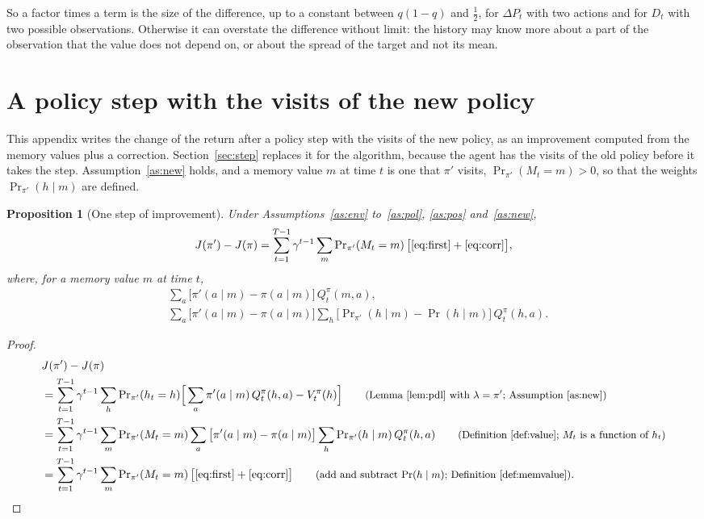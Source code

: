 \documentclass{article}
\newcounter{algo}
\newtheorem{proposition}{Proposition}[section]
\theoremstyle{definition}
\newcommand{\Prn}{\Pr\nolimits_{\pi'}}
\newcommand{\dP}{\Delta P}
\newcommand{\why}[1]{\tag*{\small(#1)}}
\begin{document}
So a factor times a term is the size of the difference, up to a constant between $q(1-q)$ and $\tfrac12$, for $\dP_t$ with two actions and for $D_t$ with two possible observations. Otherwise it can overstate the difference without limit: the history may know more about a part of the observation that the value does not depend on, or about the spread of the target and not its mean.

\section{A policy step with the visits of the new policy}\label{sec:layer5}

This appendix writes the change of the return after a policy step with the visits of the new policy, as an improvement computed from the memory values plus a correction. Section~\ref{sec:step} replaces it for the algorithm, because the agent has the visits of the old policy before it takes the step. Assumption~\ref{as:new} holds, and a memory value $m$ at time $t$ is one that $\pi'$ visits, $\Prn(M_t=m)>0$, so that the weights $\Prn(h\mid m)$ are defined.

\begin{proposition}[One step of improvement]\label{prop:improve}
Under Assumptions~\ref{as:env} to~\ref{as:pol}, \ref{as:pos} and~\ref{as:new},
\[
J(\pi')-J(\pi)=\sum_{t=1}^{T-1}\gamma^{t-1}\sum_m\Prn(M_t=m)\,\big[\eqref{eq:first}+\eqref{eq:corr}\big],
\]
where, for a memory value $m$ at time $t$,
\begin{align}
&\sum_a\big[\pi'(a\mid m)-\pi(a\mid m)\big]\,Q^\pi_t(m,a), \label{eq:first}\\
&\sum_a\big[\pi'(a\mid m)-\pi(a\mid m)\big]\sum_h\big[\Prn(h\mid m)-\Pr(h\mid m)\big]\,Q^\pi_t(h,a). \label{eq:corr}
\end{align}
\end{proposition}

\begin{proof}
\begin{align*}
&J(\pi')-J(\pi)\\
&=\sum_{t=1}^{T-1}\gamma^{t-1}\sum_h\Prn(h_t=h)\Big[\sum_a\pi'(a\mid m)\,Q^\pi_t(h,a)-V^\pi_t(h)\Big] \why{Lemma~\ref{lem:pdl} with $\lambda=\pi'$; Assumption~\ref{as:new}}\\
&=\sum_{t=1}^{T-1}\gamma^{t-1}\sum_m\Prn(M_t=m)\sum_a\big[\pi'(a\mid m)-\pi(a\mid m)\big]\sum_h\Prn(h\mid m)\,Q^\pi_t(h,a) \why{Definition~\ref{def:value}; $M_t$ is a function of $h_t$}\\
&=\sum_{t=1}^{T-1}\gamma^{t-1}\sum_m\Prn(M_t=m)\,\big[\eqref{eq:first}+\eqref{eq:corr}\big] \why{add and subtract $\Pr(h\mid m)$; Definition~\ref{def:memvalue}}.
\end{align*}
\end{proof}
\end{document}
